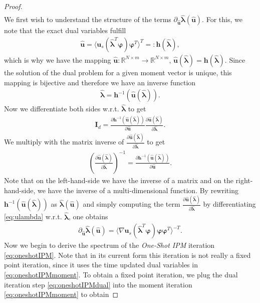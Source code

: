 \begin{proof}
\begin{align}
\end{align}
We first wish to understand the structure of the terms $\partial_{\bm{\hat u}} \bm{\hat \lambda}(\bm{\hat u})$. For this, we note that the exact dual variables fulfill
\begin{align}\label{eq:ulambda}
\bm{\hat u} = \langle \bm{u}_s(\bm{\hat \lambda}^T\bm{\varphi})\bm{\varphi}^T\rangle^T =: \bm{h}(\bm{\hat \lambda}),
\end{align}
which is why we have the mapping $\bm{\hat u}:\mathbb{R}^{N\times m}\to\mathbb{R}^{N\times m}$, $\bm{\hat u}(\bm{\hat \lambda}) = \bm{h}(\bm{\hat \lambda})$. Since the solution of the dual problem for a given moment vector is unique, this mapping is bijective and therefore we have an inverse function
\begin{align}\label{eq:lambdau}
\bm{\hat \lambda} = \bm{h}^{-1}(\bm{\hat u}(\bm{\hat \lambda})).
\end{align}
Now we differentiate both sides w.r.t. $\bm{\hat \lambda}$ to get
\begin{align*}
\bm{I}_{d} = \frac{\partial \bm{h}^{-1}(\bm{\hat u}(\bm{\hat \lambda}))}{\partial \bm{\hat u}}\frac{\partial \bm{\hat u}(\bm{\hat \lambda})}{\partial \bm{\hat \lambda}}.
\end{align*}
We multiply with the matrix inverse of $\frac{\partial \bm{\hat u}(\bm{\hat \lambda})}{\partial \bm{\hat \lambda}}$ to get
\begin{align*}
\left(\frac{\partial \bm{\hat u}(\bm{\hat \lambda})}{\partial \bm{\hat \lambda}}\right)^{-1} = \frac{\partial \bm{h}^{-1}(\bm{\hat u}(\bm{\hat \lambda}))}{\partial \bm{\hat u}}.
\end{align*}
Note that on the left-hand-side we have the inverse of a matrix and on the right-hand-side, we have the inverse of a multi-dimensional function. By rewriting $\bm{h}^{-1}(\bm{\hat u}(\bm{\hat \lambda}))$ as $\bm{\hat \lambda}(\bm{\hat u})$ and simply computing the term $\frac{\partial \bm{\hat u}(\bm{\hat \lambda})}{\partial \bm{\hat \lambda}}$ by differentiating \eqref{eq:ulambda} w.r.t. $\bm{\hat \lambda}$, one obtains
\begin{align}\label{eq:dudlambdaex}
\partial_{\bm{\hat u}} \bm{\hat \lambda}(\bm{\hat u}) = \langle \nabla\bm{u}_s(\bm{\hat \lambda}^T\bm{\varphi})\bm{\varphi}\bm{\varphi}^T\rangle^{-T}.
\end{align}
Now we begin to derive the spectrum of the \textit{One-Shot IPM} iteration \eqref{eq:oneshotIPM}. Note that in its current form this iteration is not really a fixed point iteration, since it uses the time updated dual variables in \eqref{eq:oneshotIPMmoment}. To obtain a fixed point iteration, we plug the dual iteration step \eqref{eq:oneshotIPMdual} into the moment iteration \eqref{eq:oneshotIPMmoment} to obtain

\end{proof}
